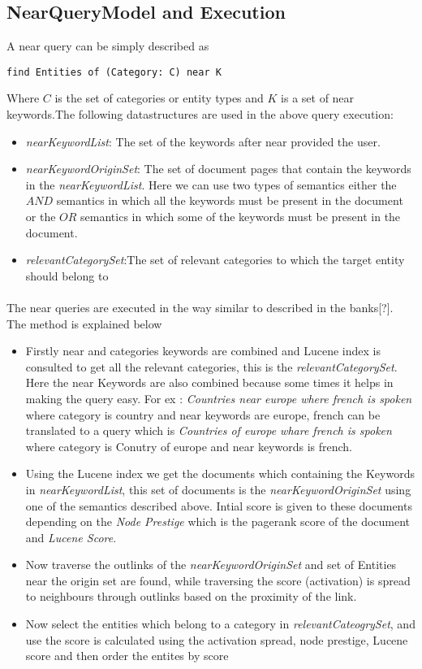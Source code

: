 \documentclass[a4paper,12pt]{report}
\begin{document}
\subsection{NearQueryModel and Execution}
A near query can be simply described as \begin{verbatim}find Entities of (Category: C) near K\end{verbatim} Where $C$ is the set of categories or entity types and $K$ is a set of near keywords.The following datastructures are used in the above query execution:
\begin{itemize}
\item\textit{nearKeywordList}: The set of the keywords after near provided the user.
\item\textit{nearKeywordOriginSet}: The set of document pages that contain the keywords in the \textit{nearKeywordList}. Here we can use two types of semantics either the $AND$ semantics in which all the keywords must be present in the document or the $OR$ semantics in which some of the keywords must be present in the document.
\item\textit{relevantCategorySet}:The set of relevant categories to which the target entity should belong to
\end{itemize}
\paragraph*{}
The near queries are executed in the way similar to described in the banks[?]. The method is explained below
\begin{itemize}
\item Firstly near and categories keywords are combined and Lucene index is consulted to get all the relevant categories, this is the \textit{relevantCategorySet}. Here the near Keywords are also combined because some times it helps in making the query easy. For ex : \textit{ Countries near europe where french is spoken} where category is country and near keywords are europe, french can be translated to a query which is \textit{ Countries of europe whare french is spoken} where category is Conutry of europe and near keywords is french.
\item Using the Lucene index we get the documents which containing the Keywords in \textit{nearKeywordList}, this set of documents is the \textit{nearKeywordOriginSet} using one of the semantics described above. Intial score is given to these documents depending on the \textit{Node Prestige} which is the pagerank score of the document and \textit{Lucene Score}.
\item Now traverse the outlinks of the \textit{nearKeywordOriginSet} and set of Entities near the origin set are found, while traversing the score (activation) is spread to neighbours through outlinks based on the proximity of the link.
\item Now select the entities which belong to a category in \textit{relevantCateogrySet}, and use the score is calculated using the activation spread, node prestige, Lucene score and then order the entites by score
\end{itemize}
\end{document}

